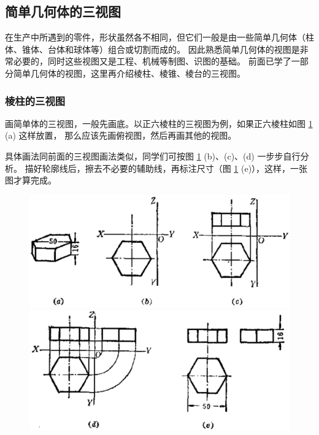 \subsection{简单几何体的三视图}\label{subsec:czjh2-8-4}

在生产中所遇到的零件，形状虽然各不相同，但它们一般是由一些简单几何体（柱体、锥体、台体和球体等）组合或切割而成的。
因此熟悉简单几何体的视图是非常必要的，同时这些视图又是工程、机械等制图、识图的基础。
前面已学了一部分简单几何体的视图，这里再介绍棱柱、棱锥、棱台的三视图。


\subsubsection{棱柱的三视图}

画简单体的三视图，一般先画底。以正六棱柱的三视图为例，如果正六棱柱如图 \ref{fig:czjh2-8-16} (a) 这样放置，
那么应该先画俯视图，然后再画其他的视图。

具体画法同前面的三视图画法类似，同学们可按图 \ref{fig:czjh2-8-16} (b)、(c)、(d) 一步步自行分析。
描好轮廓线后，擦去不必要的辅助线，再标注尺寸（图 \ref{fig:czjh2-8-16} (e)），这样，一张图才算完成。

\begin{figure}[htbp]
    \centering
    \includegraphics[width=12cm]{../pic/czjh2-ch8-16-1.png}
    \includegraphics[width=12cm]{../pic/czjh2-ch8-16-2.png}
    \caption{}\label{fig:czjh2-8-16}
\end{figure}

